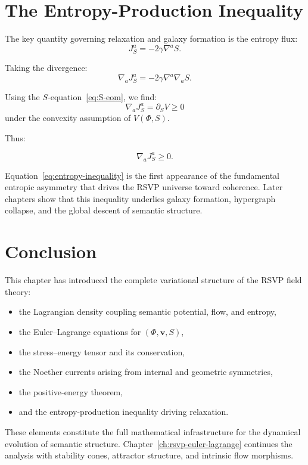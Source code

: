 \section{The Entropy-Production Inequality}

The key quantity governing relaxation and galaxy formation is the entropy flux:
\[
J^a_S = -2\gamma \nabla^a S.
\]

Taking the divergence:
\[
\nabla_a J^a_S = -2\gamma \nabla^a \nabla_a S.
\]

Using the $S$-equation~\eqref{eq:S-eom}, we find:
\[
\nabla_a J^a_S = \partial_S V \ge 0
\]
under the convexity assumption of $V(\Phi, S)$.

Thus:

\begin{equation}
\label{eq:entropy-inequality}
\nabla_a J^a_S \ge 0.
\end{equation}

\begin{remark}
Equation~\eqref{eq:entropy-inequality} is the first appearance of the fundamental entropic asymmetry that drives the RSVP universe toward coherence.  
Later chapters show that this inequality underlies galaxy formation, hypergraph collapse, and the global descent of semantic structure.
\end{remark}

\section{Conclusion}

This chapter has introduced the complete variational structure of the RSVP field theory:

\begin{itemize}
\item the Lagrangian density coupling semantic potential, flow, and entropy,
\item the Euler--Lagrange equations for $(\Phi, \mathbf{v}, S)$,
\item the stress--energy tensor and its conservation,
\item the Noether currents arising from internal and geometric symmetries,
\item the positive-energy theorem,
\item and the entropy-production inequality driving relaxation.
\end{itemize}

These elements constitute the full mathematical infrastructure for the dynamical evolution of semantic structure.  
Chapter~\ref{ch:rsvp-euler-lagrange} continues the analysis with stability cones, attractor structure, and intrinsic flow morphisms.
